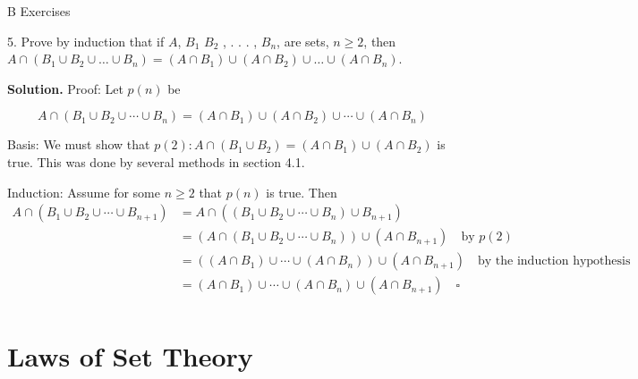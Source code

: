 \documentclass[10pt,]{book}
\theoremstyle{plain}
\theoremstyle{definition}
\theoremstyle{definition}
\theoremstyle{definition}
\begin{document}
\par\smallskip\noindent
\hypertarget{exercisegroup-2}{}\typeout{************************************************}
\typeout{************************************************}
B Exercises%
\begin{exercisegroup}
\item[5.]\hypertarget{ex-generalized_distrib}{}Prove by induction that if \(A\), \(B_1\) \(B_2\) , . . . , \(B_n\), are sets, \(n\geq 2\), then 
\(A\cap ( B_1 \cup  B_2\cup  \dots  \cup  B_n) = (A \cap B_1) \cup  (A \cap B_2 ) \cup  \dots \cup  (A\cap B_n)\).%
\par\smallskip
\par\smallskip
\noindent\textbf{Solution.}\hypertarget{solution-1}{}\quad
 Proof: Let \(p(n)\) be

\begin{equation*}A\cap (B_1\cup B_2\cup \cdots \cup B_n)=(A\cap B_1)\cup (A\cap B_2)\cup \cdots \cup (A\cap B_n)\end{equation*}%
\par
Basis: We must show that \(p(2) : A \cap  (B_1 \cup B_2 )=(A\cap B_1) \cup (A\cap B_2)\) is true.
 This was done by several methods in section 4.1.%
\par
Induction: Assume for some \(n\geq 2\) that \(p(n)\) is true. Then
 \begin{equation*}
 \begin{split}
 A\cap (B_1\cup B_2\cup \cdots \cup B_{n+1})&=A\cap ((B_1\cup B_2\cup \cdots \cup B_n)\cup B_{n+1})\\
	&=(A \cap (B_1\cup B_2\cup \cdots \cup B_n))\cup (A\cap B_{n+1}) \quad \textrm{by } p(2)\\
	&=((A\cap B_1)\cup \cdots \cup (A\cap B_n))\cup (A\cap B_{n+1})\quad \textrm{by the induction hypothesis}\\
	&=(A\cap B_1)\cup \cdots \cup (A\cap B_n)\cup (A\cap B_{n+1})\quad \square\\
 \end{split}
 \end{equation*} 
%
\end{exercisegroup}
\par\smallskip\noindent
\typeout{************************************************}
\typeout{************************************************}
\section[Laws of Set Theory]{Laws of Set Theory}\label{s-laws-of-set-theory}
\typeout{************************************************}
\typeout{************************************************}
\end{document}
